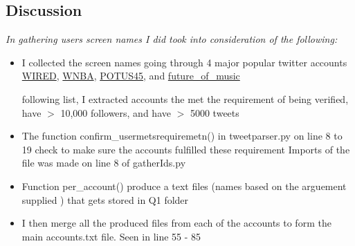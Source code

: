 \documentclass[12pt]{article}
\begin{document}
\subsection*{\color{blue}{Answer}}




\subsection*{Discussion}
\emph{In gathering users screen names I did took into consideration of the following:}
    \begin{itemize}
        \item I collected the screen names going through 4 major popular twitter accounts 
        \href{https://twitter.com/WIRED}{WIRED}, \href{https://twitter.com/WNBA}{WNBA}, \href{https://twitter.com/POTUS45}{POTUS45}, and \href{https://twitter.com/future_of_music}{future\_of\_music}
        
         following list, I extracted accounts the met the requirement of  being verified, have $>$ 10,000 followers, and have $>$ 5000 tweets 
         \item The function confirm\_usermetsrequiremetn() in tweetparser.py on line 8 to 19 check to make sure the accounts fulfilled these requirement
          Imports of the file was made on line 8 of gatherIds.py
         
         \item Function per\_account() produce a text files (names based on the arguement supplied ) that gets stored in Q1 folder
         \item I then merge all the produced files from each of the accounts to form the main accounts.txt file.  Seen in line 55 - 85
         
    \end{itemize}
\end{document}

